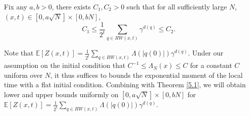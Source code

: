 \documentclass[10pt,a4paper]{amsart}
\begin{document}
\begin{theorem} \label{5.1}
    Fix any $a, b >0$, there exists $C_1, C_2 >0$ such that for all sufficiently large $N$,  $(x,t) \in [0,a\sqrt{N}] \times [0,bN]$, 
    $$C_1 \leq \frac{1}{2^t} \sum_{q \in RW(x,t)} \gamma^{d(q)} \leq C_2.$$
\end{theorem}

\begin{remark}
Note that $\mathbb{E}[{Z(x,t)}]=\frac{1}{2^t}\sum_{q \in RW(x, t)} \Lambda(|q(0)|) \gamma^{d(q)}$. Under our assumption on the initial condition that $C^{-1} \leq \Lambda_N(x) \leq C$ for a  constant $C$ uniform over $N$, it thus suffices to bounds the exponential moment of the local time with a flat initial condition. Combining with Theorem \ref{5.1}, we will obtain  lower and upper bounds uniformly on $[0,a\sqrt{N}] \times [0,bN]$ for $\mathbb{E}[{Z(x,t)}]=\frac{1}{2^t}\sum_{q \in RW(x, t)} \Lambda(|q(0)|) \gamma^{d(q)}$.
\end{remark}
\end{document}
